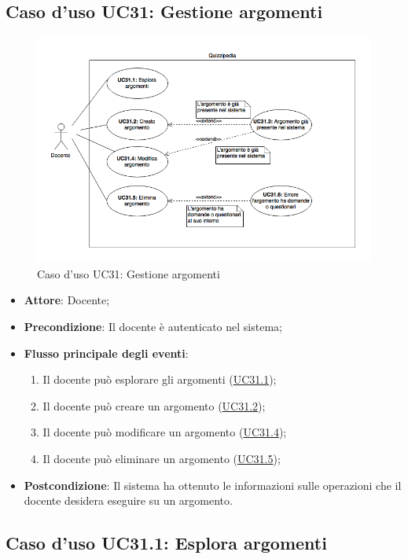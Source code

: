 \documentclass[12pt,a4paper]{article}
\begin{document}
\subsection{Caso d'uso UC31: Gestione argomenti}
\begin{figure}[H]
	\centering
	\includegraphics[width=\textwidth]{diagramUC31.png}
	\caption{Caso d'uso UC31: Gestione argomenti}\label{fig:UC31} 
\end{figure}
\begin{itemize}

\item \textbf{Attore}: Docente; 
\item \textbf{Precondizione}: Il docente è autenticato nel sistema;

\item \textbf{Flusso principale degli eventi}:
\begin{enumerate}
	\item Il docente può esplorare gli argomenti (\hyperlink{UC31.1}{UC31.1});
	\item Il docente può creare un argomento (\hyperlink{UC31.2}{UC31.2});
	\item Il docente può modificare un argomento (\hyperlink{UC31.4}{UC31.4});
	\item Il docente può eliminare un argomento (\hyperlink{UC31.5}{UC31.5});
	
\end{enumerate}
\item \textbf{Postcondizione}: Il sistema ha ottenuto le informazioni sulle operazioni che il docente desidera eseguire su un argomento.
\end{itemize}
\hypertarget{UC31.1}{}
\subsection{Caso d'uso UC31.1: Esplora argomenti}
\end{document}
